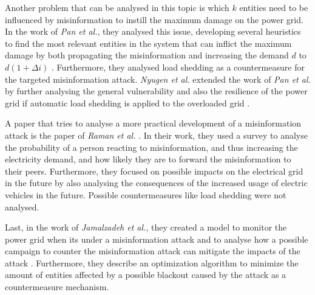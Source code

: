Another problem that can be analysed in this topic is which $k$ entities 
need to be influenced by misinformation to instill 
the maximum damage on the power grid. In the work of \textit{Pan et al.}, 
they analysed this issue, developing several heuristics to find the most 
relevant entities in the system that can inflict the maximum damage by both 
propagating the misinformation and increasing the demand 
$d$ to $d(1+\Delta i)$ \cite{pan2017threat}. 
Furthermore, they analysed load shedding as a
countermeasure for the targeted misinformation attack.
\textit{Nyugen et al.} extended the work of \textit{Pan et al.}
by further analysing the general vulnerability and also the resilience of 
the power grid if automatic load shedding is applied to the overloaded grid
\cite{nguyen2019vulnerability}.

A paper that tries to analyse a more practical development of a misinformation
attack is the paper of \textit{Raman et al.} \cite{raman2020weaponizing}.
In their work, they used a survey to analyse the probability of a person
reacting to misinformation, and thus increasing the electricity demand,
and how likely they are to forward the misinformation to their peers.
Furthermore, they focused on possible impacts on the electrical grid in 
the future by also analysing the consequences of the increased 
usage of electric vehicles in the future. Possible countermeasures like
load shedding were not analysed.

Last, in the work of \textit{Jamalzadeh et al.}, they created a model to monitor
the power grid when its under a misinformation attack and to analyse
how a possible campaign to counter the misinformation attack can mitigate
the impacts of the attack \cite{jamalzadeh2022protecting}. Furthermore,
they describe an optimization algorithm to minimize the amount of 
entities affected by a possible blackout caused by the attack as 
a countermeasure mechanism.